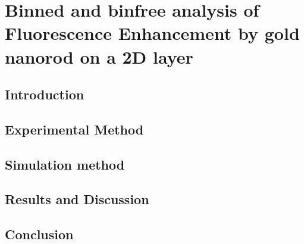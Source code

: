 \chapter{Binned and binfree analysis of Fluorescence Enhancement by gold nanorod on a 2D layer}
\section{Introduction}
\section{Experimental Method}
\section{Simulation method}
\section{Results and Discussion}
\section{Conclusion}